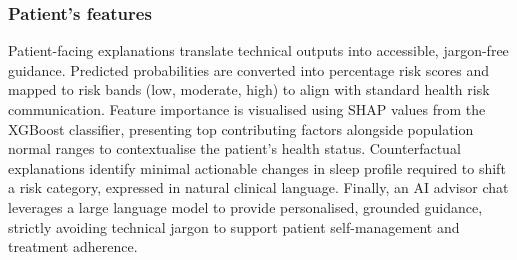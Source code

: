 \subsubsection{Patient's features}

Patient-facing explanations translate technical outputs into accessible, jargon-free guidance. Predicted probabilities are converted into percentage risk scores and mapped to risk bands (low, moderate, high) to align with standard health risk communication. Feature importance is visualised using SHAP values from the XGBoost classifier, presenting top contributing factors alongside population normal ranges to contextualise the patient's health status. Counterfactual explanations identify minimal actionable changes in sleep profile required to shift a risk category, expressed in natural clinical language. Finally, an AI advisor chat leverages a large language model to provide personalised, grounded guidance, strictly avoiding technical jargon to support patient self-management and treatment adherence.
